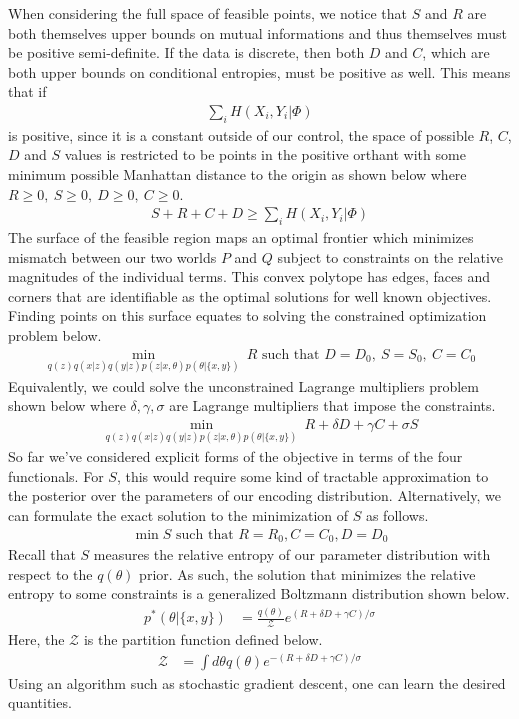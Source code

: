 \documentclass[book.tex]{subfiles}
\begin{document}
When considering the full space of feasible points, we notice that $S$ and $R$ are both themselves upper bounds on mutual informations and thus themselves must be positive semi-definite. If the data is discrete, then both $D$ and $C$, which are both upper bounds on conditional entropies, must be positive as well. This means that if 
\begin{align}
\sum_i H(X_i,Y_i|\Phi)
\end{align} 
is positive, since it is a constant outside of our control, the space of possible $R$, $C$, $D$ and $S$ values is restricted to be points in the positive orthant with some minimum possible Manhattan distance to the origin as shown below where $R\geq0,\ S\geq0,\ D\geq0,\ C\geq0$.
\begin{align}
S+R+C+D\geq \sum_i H(X_i,Y_i|\Phi)
\end{align}
The surface of the feasible region maps an optimal frontier which minimizes mismatch between our two worlds $P$ and $Q$ subject to constraints on the relative magnitudes of the individual terms. This convex polytope has edges, faces and corners that are identifiable as the optimal solutions for well known objectives. Finding points on this surface equates to solving the constrained optimization problem below.
\begin{align}
\min_{q(z)q(x|z)q(y|z)p(z|x,\theta)p(\theta|\{x,y\})}\ R\textrm{ such that }D=D_0,\ S=S_0,\ C=C_0
\end{align}
Equivalently, we could solve the unconstrained Lagrange multipliers problem shown below where $\delta,\gamma,\sigma$ are Lagrange multipliers that impose the constraints.
\begin{align}
\min_{q(z)q(x|z)q(y|z)p(z|x,\theta)p(\theta|\{x,y\})}\ R+\delta D+\gamma C+\sigma S
\end{align}
So far we've considered explicit forms of the objective in terms of the four functionals. For $S$, this would require some kind of tractable approximation to the posterior over the parameters of our encoding distribution. Alternatively, we can formulate the exact solution to the minimization of $S$ as follows.
\begin{align}
\min S \textrm{ such that } R=R_0,C=C_0,D=D_0
\end{align}
Recall that $S$ measures the relative entropy of our parameter distribution with respect to the $q(\theta)$ prior. As such, the solution that minimizes the relative entropy to some constraints is a generalized Boltzmann distribution shown below.
\begin{align}
p^*(\theta|\{x,y\}) &=\frac{q(\theta)}{\mathcal{Z}}e^{(R+\delta D+ \gamma C)/\sigma}
\end{align}
Here, the $\mathcal{Z}$ is the partition function defined below.
\begin{align}
\mathcal{Z} &=\int d\theta q(\theta)e^{-(R+\delta D+\gamma C) / \sigma}
\end{align}
Using an algorithm such as stochastic gradient descent, one can learn the desired quantities.
\end{document}

